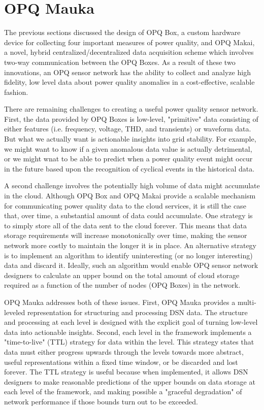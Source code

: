 \section{OPQ Mauka}
\label{sec:opq-mauka}

The previous sections discussed the design of OPQ Box, a custom hardware device for collecting four important measures of power quality, and OPQ Makai, a novel, hybrid centralized/decentralized data acquisition scheme which involves two-way communication between the OPQ Boxes.  As a result of these two innovations, an OPQ sensor network has the ability to collect and analyze high fidelity, low level data about power quality anomalies in a cost-effective, scalable fashion.

There are remaining challenges to creating a useful power quality sensor network. First, the data provided by OPQ Boxes is low-level, "primitive" data consisting of either features (i.e. frequency, voltage, THD, and transients) or waveform data. But what we actually want is actionable insights into grid stability. For example, we might want to know if a given anomalous data value is actually detrimental, or we might wnat to be able to predict when a power quality event might occur in the future based upon the recognition of cyclical events in the historical data.

A second challenge involves the potentially high volume of data might accumulate in the cloud. Although OPQ Box and OPQ Makai provide a scalable mechanism for communicating power quality data to the cloud services, it is still the case that, over time, a substantial amount of data could accumulate. One strategy is to simply store all of the data sent to the cloud forever. This means that data storage requirements will increase monotonically over time, making the sensor network more costly to maintain the longer it is in place. An alternative strategy is to implement an algorithm to identify uninteresting (or no longer interesting) data and discard it.  Ideally, such an algorithm would enable OPQ sensor network designers to calculate an upper bound on the total amount of cloud storage required as a function of the number of nodes (OPQ Boxes) in the network.

OPQ Mauka addresses both of these issues. First, OPQ Mauka provides a multi-leveled representation for structuring and processing DSN data. The structure and processing at each level is designed with the explicit goal of turning low-level data into actionable insights. Second, each level in the framework implements a "time-to-live" (TTL) strategy for data within the level. This strategy states that data must either progress upwards through the levels towards more abstract, useful representations within a fixed time window, or be discarded and lost forever. The TTL strategy is useful because when implemented, it allows DSN designers to make reasonable predictions of the upper bounds on data storage at each level of the framework, and making possible a "graceful degradation" of network performance if those bounds turn out to be exceeded.

